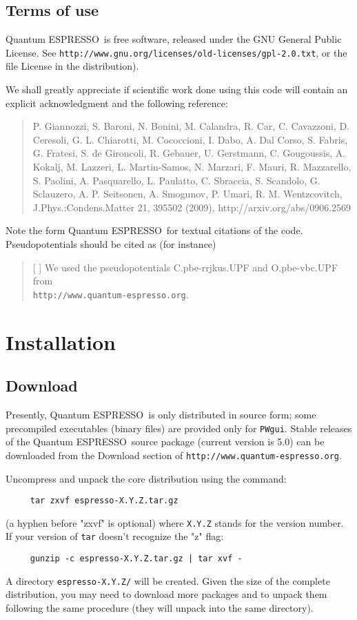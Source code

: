 \documentclass[12pt,a4paper]{article}
\def\version{5.0}
\def\qe{{\sc Quantum ESPRESSO}}
\begin{document}
\subsection{Terms of use}
\label{SubSec:Terms}

\qe\ is free software, released under the 
GNU General Public License. See
\texttt{http://www.gnu.org/licenses/old-licenses/gpl-2.0.txt}, 
or the file License in the distribution).
    
We shall greatly appreciate if scientific work done using this code will 
contain an explicit acknowledgment and the following reference:
\begin{quote}
P. Giannozzi, S. Baroni, N. Bonini, M. Calandra, R. Car, C. Cavazzoni,
D. Ceresoli, G. L. Chiarotti, M. Cococcioni, I. Dabo, A. Dal Corso,
S. Fabris, G. Fratesi, S. de Gironcoli, R. Gebauer, U. Gerstmann,
C. Gougoussis, A. Kokalj, M. Lazzeri, L. Martin-Samos, N. Marzari,
F. Mauri, R. Mazzarello, S. Paolini, A. Pasquarello, L. Paulatto,
C. Sbraccia, S. Scandolo, G. Sclauzero, A. P. Seitsonen, A. Smogunov,
P. Umari, R. M. Wentzcovitch, J.Phys.:Condens.Matter 21, 395502 (2009),
http://arxiv.org/abs/0906.2569
\end{quote}
Note the form \qe\ for textual citations of the code.
Pseudopotentials should be cited as (for instance)
\begin{quote}
[ ] We used the pseudopotentials C.pbe-rrjkus.UPF
and O.pbe-vbc.UPF from\\
\texttt{http://www.quantum-espresso.org}.
\end{quote}
\section{Installation}

\subsection{Download}
 
Presently, \qe\ is only distributed in source form; 
some precompiled executables (binary files) are provided only for 
\texttt{PWgui}. 
Stable releases of the \qe\ source package (current version 
is \version) can be downloaded from the Download section
of \texttt{http://www.quantum-espresso.org}.

Uncompress and unpack the core distribution using the command:
\begin{verbatim}
     tar zxvf espresso-X.Y.Z.tar.gz
\end{verbatim}
(a hyphen before "zxvf" is optional) where \texttt{X.Y.Z} stands for the
version number. If your version of \texttt{tar} 
doesn't recognize the "z" flag:
\begin{verbatim}
     gunzip -c espresso-X.Y.Z.tar.gz | tar xvf -
\end{verbatim}
A directory \texttt{espresso-X.Y.Z/} will be created. Given the size 
of the complete distribution, you may need to download more packages
and to unpack them following the same procedure (they will unpack into 
the same directory). 
\end{document}
